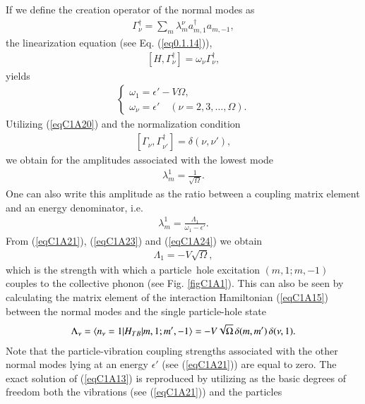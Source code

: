 If we define the creation operator of the normal modes as
 \begin{align}\label{eqC1A19} 
\Gamma^\dagger_\nu=\sum_m \lambda_m^\nu a_{m,1}^\dagger a_{m,-1},
 \end{align}
the linearization equation (see Eq. (\ref{eq0.1.14})),
 \begin{align}\label{eqC1A20} 
[H,\Gamma_\nu^\dagger]=\omega_\nu\Gamma^\dagger_\nu,
 \end{align}
yields
 \begin{align}\label{eqC1A21} 
\left\{\begin{array}{l}
 \omega_1=\epsilon'-V\Omega,\\ 
\omega_\nu=\epsilon'\quad (\nu=2,3,\dots,\Omega).
\end{array} \right.
 \end{align}
Utilizing (\ref{eqC1A20}) and the normalization condition
 \begin{align}\label{eqC1A22} 
[\Gamma_\nu,\Gamma^\dagger_{\nu'}]=\delta(\nu,\nu'),
 \end{align}
we obtain for the amplitudes associated with the lowest mode
 \begin{align}\label{eqC1A23} 
\lambda_m^1=\frac{1}{\sqrt{\Omega}}.
 \end{align}
One can also write this amplitude as the ratio between a coupling matrix
element and an energy denominator, i.e.
 \begin{align}\label{eqC1A24} 
\lambda_m^1=\frac{\Lambda_1}{\omega_1-\epsilon'}.
 \end{align} 
From (\ref{eqC1A21}), (\ref{eqC1A23}) and (\ref{eqC1A24}) we obtain
 \begin{align}\label{eqC1A25} 
\Lambda_1=-V\sqrt{\Omega},
 \end{align}
which is the strength with which a particle~hole excitation $(m, 1; m, -1)$
couples to the collective phonon (see Fig. \ref{figC1A1}). This can also be seen by calculating
the matrix element of the interaction Hamiltonian (\ref{eqC1A15}) between the normal
modes and the single particle-hole state
 \begin{align}\label{eqC1A26} 
\Lambda_\nu=\langle {n_\nu=1|H_{TB}|m,1;m',-1} \rangle=-V\sqrt{\Omega}\,\delta(m,m')\,\delta(\nu,1).
 \end{align}
Note that the particle-vibration coupling strengths associated with the other
normal modes lying at an energy $\epsilon'$ (see (\ref{eqC1A21})) are equal to zero. The exact solution of (\ref{eqC1A13}) is reproduced by utilizing
as the basic degrees of freedom both the vibrations (see (\ref{eqC1A21})) and the particles
